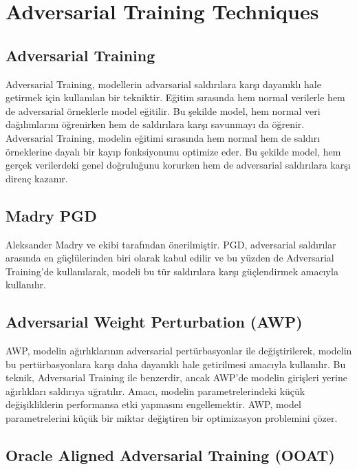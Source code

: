 \section{Adversarial Training Techniques}

\subsection{Adversarial Training}

Adversarial Training, modellerin advarsarial saldırılara karşı dayanıklı hale getirmek için kullanılan bir tekniktir. Eğitim sırasında hem normal verilerle hem de adversarial örneklerle model eğitilir. Bu şekilde model, hem normal veri dağılımlarını öğrenirken hem de saldırılara karşı savunmayı da öğrenir. Adversarial Training, modelin eğitimi sırasında hem normal hem de saldırı örneklerine dayalı bir kayıp fonksiyonunu optimize eder. Bu şekilde model, hem gerçek verilerdeki genel doğruluğunu korurken hem de adversarial saldırılara karşı direnç kazanır.

\newpage

\subsection{Madry PGD}

Aleksander Madry ve ekibi tarafından önerilmiştir. PGD, adversarial saldırılar arasında en güçlülerinden biri olarak kabul edilir ve bu yüzden de Adversarial Training'de kullanılarak, modeli bu tür saldırılara karşı güçlendirmek amacıyla kullanılır.

\newpage

\subsection{Adversarial Weight Perturbation (AWP)}

AWP, modelin ağırlıklarının adversarial pertürbasyonlar ile değiştirilerek, modelin bu pertürbasyonlara karşı daha dayanıklı hale getirilmesi amacıyla kullanılır. Bu teknik, Adversarial Training ile benzerdir, ancak AWP'de modelin girişleri yerine ağırlıkları saldırıya uğratılır. Amacı, modelin parametrelerindeki küçük değişikliklerin performansa etki yapmasını engellemektir. AWP, model parametrelerini küçük bir miktar değiştiren bir optimizasyon problemini çözer.

\newpage

\subsection{Oracle Aligned Adversarial Training (OOAT)}

